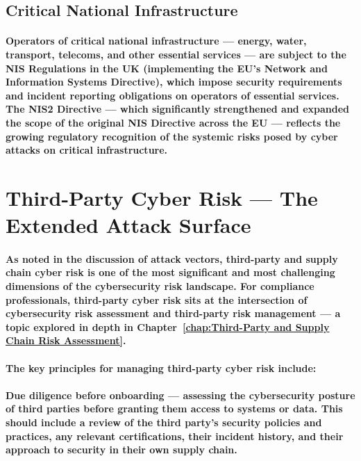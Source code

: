 \subsection{Critical National Infrastructure}
\paragraph{Operators of \textbf{critical national infrastructure} — energy, water, transport, telecoms, and other essential services — are subject to the \textbf{NIS Regulations} in the UK (implementing the EU's Network and Information Systems Directive), which impose security requirements and incident reporting obligations on operators of essential services. The NIS2 Directive — which significantly strengthened and expanded the scope of the original NIS Directive across the EU — reflects the growing regulatory recognition of the systemic risks posed by cyber attacks on critical infrastructure.}

\section{Third-Party Cyber Risk — The Extended Attack Surface}
\paragraph{As noted in the discussion of attack vectors, third-party and supply chain cyber risk is one of the most significant and most challenging dimensions of the cybersecurity risk landscape. For compliance professionals, third-party cyber risk sits at the intersection of cybersecurity risk assessment and third-party risk management — a topic explored in depth in Chapter~\ref{chap:Third-Party and Supply Chain Risk Assessment}.}
\paragraph{The key principles for managing third-party cyber risk include:}
\paragraph{\textbf{Due diligence before onboarding} — assessing the cybersecurity posture of third parties before granting them access to systems or data. This should include a review of the third party's security policies and practices, any relevant certifications, their incident history, and their approach to security in their own supply chain.}
